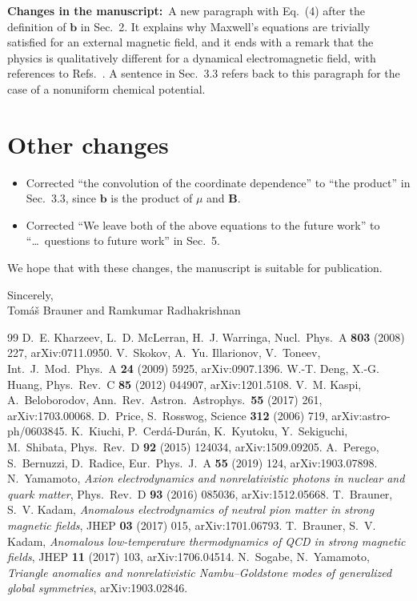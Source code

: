 \documentclass[11pt,a4paper]{article}
\newcommand{\vek}[1]{\bm{#1}}
\newcommand{\changes}{\par\smallskip\noindent\textbf{Changes in the manuscript:}\ }
\begin{document}
\changes A new paragraph with Eq.~(4) after the definition of $\vek b$ in Sec.~2. It explains why Maxwell's equations are trivially satisfied for an external magnetic field, and it ends with a remark that the physics is qualitatively different for a dynamical electromagnetic field, with references to Refs.~\cite{Yamamoto:2015maz,Brauner:2017mui,BraunerKadam2017thermo,SogabeYamamoto2019}. A sentence in Sec.~3.3 refers back to this paragraph for the case of a nonuniform chemical potential.

\section*{Other changes}

\begin{itemize}[nosep]
\item Corrected ``the convolution of the coordinate dependence'' to ``the product'' in Sec.~3.3, since $\vek b$ is the product of $\mu$ and $\vek B$.
\item Corrected ``We leave both of the above equations to the future work'' to ``\dots\ questions to future work'' in Sec.~5.
\end{itemize}

\bigskip
\noindent We hope that with these changes, the manuscript is suitable for publication.

\medskip
\noindent Sincerely,\\
Tom\'a\v{s} Brauner and Ramkumar Radhakrishnan

\begin{thebibliography}{99}\small
{} D.~E. Kharzeev, L.~D. McLerran, H.~J. Warringa, Nucl.\ Phys.\ A \textbf{803} (2008) 227, arXiv:0711.0950.
 V.~Skokov, A.~Yu. Illarionov, V.~Toneev, Int.\ J.\ Mod.\ Phys.\ A \textbf{24} (2009) 5925, arXiv:0907.1396.
 W.-T. Deng, X.-G. Huang, Phys.\ Rev.\ C \textbf{85} (2012) 044907, arXiv:1201.5108.
 V.~M. Kaspi, A.~Beloborodov, Ann.\ Rev.\ Astron.\ Astrophys.\ \textbf{55} (2017) 261, arXiv:1703.00068.
 D.~Price, S.~Rosswog, Science \textbf{312} (2006) 719, arXiv:astro-ph/0603845.
 K.~Kiuchi, P.~Cerd\'a-Dur\'an, K.~Kyutoku, Y.~Sekiguchi, M.~Shibata, Phys.\ Rev.\ D \textbf{92} (2015) 124034, arXiv:1509.09205.
 A.~Perego, S.~Bernuzzi, D.~Radice, Eur.\ Phys.\ J.\ A \textbf{55} (2019) 124, arXiv:1903.07898.
 N.~Yamamoto, \emph{Axion electrodynamics and nonrelativistic photons in nuclear and quark matter}, Phys.\ Rev.\ D \textbf{93} (2016) 085036, arXiv:1512.05668.
 T.~Brauner, S.~V. Kadam, \emph{Anomalous electrodynamics of neutral pion matter in strong magnetic fields}, JHEP \textbf{03} (2017) 015, arXiv:1701.06793.
 T.~Brauner, S.~V. Kadam, \emph{Anomalous low-temperature thermodynamics of QCD in strong magnetic fields}, JHEP \textbf{11} (2017) 103, arXiv:1706.04514.
 N.~Sogabe, N.~Yamamoto, \emph{Triangle anomalies and nonrelativistic Nambu--Goldstone modes of generalized global symmetries}, arXiv:1903.02846.
\end{thebibliography}
\end{document}
